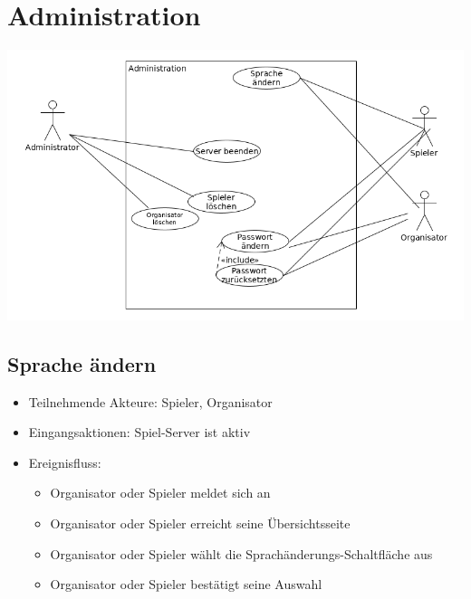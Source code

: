 \documentclass[a4paper]{scrreprt}
\begin{document}
    \section{Administration}
    \includegraphics[width=\textwidth]{uml/export/Administration.png}
     \subsection{Sprache ändern}
    \begin{itemize}
    \item Teilnehmende Akteure: \Gls{Spieler}, \Gls{Organisator}
    \item Eingangsaktionen: \Gls{Spiel-Server} ist aktiv
    \item Ereignisfluss:
        \begin{itemize}
            \item \Gls{Organisator} oder \Gls{Spieler} meldet sich an
            \item \Gls{Organisator} oder \Gls{Spieler} erreicht seine Übersichtsseite
            \item \Gls{Organisator} oder \Gls{Spieler} wählt die Sprachänderungs-Schaltfläche aus
            \item \Gls{Organisator} oder \Gls{Spieler} bestätigt seine Auswahl
        \end{itemize}
    \end{itemize}
\end{document}
